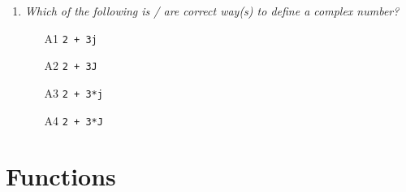 \begin{enumerate}
\begin{enumerate}
\item[A1] 
\begin{Verbatim}[commandchars=\\\{\}]
\PY{l+m+mi}{5} \PY{o}{+} \PY{n+nb}{int}\PY{p}{(}\PY{l+m+mi}{5} \PY{o}{*} \PY{n}{random}\PY{p}{(}\PY{p}{)}\PY{p}{)}
\end{Verbatim}
\item[A2]
\begin{Verbatim}[commandchars=\\\{\}]
\PY{l+m+mi}{5} \PY{o}{+} \PY{l+m+mi}{5} \PY{o}{*} \PY{n+nb}{int}\PY{p}{(}\PY{n}{random}\PY{p}{(}\PY{p}{)}\PY{p}{)}
\end{Verbatim}
\item[A3]
\begin{Verbatim}[commandchars=\\\{\}]
\PY{n+nb}{int}\PY{p}{(}\PY{l+m+mi}{5} \PY{o}{+} \PY{l+m+mi}{5} \PY{o}{*} \PY{n}{random}\PY{p}{(}\PY{p}{)}\PY{p}{)}
\end{Verbatim}
\item[A4]
\begin{Verbatim}[commandchars=\\\{\}]
\PY{n+nb}{int}\PY{p}{(}\PY{l+m+mi}{10} \PY{o}{*} \PY{n}{random}\PY{p}{(}\PY{p}{)}\PY{p}{)} \PY{o}{-} \PY{l+m+mi}{5}
\end{Verbatim}
\end{enumerate}

\vspace{6mm}

\item {\em Which of the following is / are correct way(s) to define a complex number?}\\

\begin{enumerate}
\item[A1] {\tt 2 + 3j}
\item[A2] {\tt 2 + 3J}
\item[A3] {\tt 2 + 3*j}
\item[A4] {\tt 2 + 3*J}
\end{enumerate}

\vspace{6mm}

\end{enumerate}


\section{Functions}

